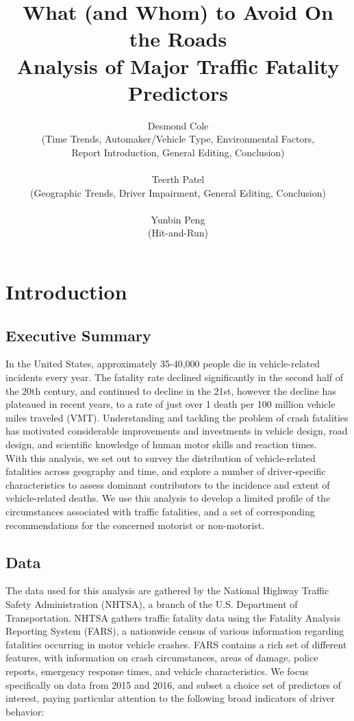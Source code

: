 \documentclass[11pt, oneside,titlepage]{article}   	%
\title{\textbf{What (and Whom) to Avoid On the Roads \\ 
\large Analysis of Major Traffic Fatality Predictors}}
\author{Desmond Cole \\
(Time Trends, Automaker/Vehicle Type, Environmental Factors, \\
Report Introduction, General Editing, Conclusion) \\
\\
Teerth Patel \\
(Geographic Trends, Driver Impairment,
General Editing, Conclusion) \\
\\
Yunbin Peng \\
(Hit-and-Run)}
\begin{document}
\maketitle
\section*{Introduction}
\subsection*{Executive Summary}
In the United States, approximately 35-40,000 people die in vehicle-related incidents every year. The fatality rate declined significantly in the second half of the 20th century, and continued to decline in the 21st, however the decline has plateaued in recent years, to a rate of just over 1 death per 100 million vehicle miles traveled (VMT). Understanding and tackling the problem of crash fatalities has motivated considerable improvements and investments in vehicle design, road design, and scientific knowledge of human motor skills and reaction times. \\ 

With this analysis, we set out to survey the distribution of vehicle-related fatalities across geography and time, and explore a number of driver-specific characteristics to assess dominant contributors to the incidence and extent of vehicle-related deaths. We use this analysis to develop a limited profile of the circumstances associated with traffic fatalities, and a set of corresponding recommendations for the concerned motorist or non-motorist.

\subsection*{Data}
The data used for this analysis are gathered by the National Highway Traffic Safety Administration (NHTSA), a branch of the U.S. Department of Transportation. NHTSA gathers traffic fatality data using the Fatality Analysis Reporting System (FARS), a nationwide census of various information regarding fatalities occurring in motor vehicle crashes. FARS contains a rich set of different features, with information on crash circumstances, areas of damage, police reports, emergency response times, and vehicle characteristics. We focus specifically on data from 2015 and 2016, and subset a choice set of predictors of interest, paying particular attention to the following broad indicators of driver behavior:
\end{document}
